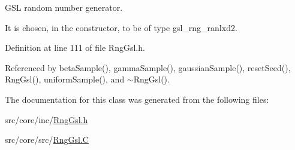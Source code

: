 G\-S\-L random number generator. 

It is chosen, in the constructor, to be of type gsl\-\_\-rng\-\_\-ranlxd2. 

Definition at line 111 of file Rng\-Gsl.\-h.



Referenced by beta\-Sample(), gamma\-Sample(), gaussian\-Sample(), reset\-Seed(), Rng\-Gsl(), uniform\-Sample(), and $\sim$\-Rng\-Gsl().



The documentation for this class was generated from the following files\-:\begin{DoxyCompactItemize}
\item 
src/core/inc/\hyperlink{_rng_gsl_8h}{Rng\-Gsl.\-h}\item 
src/core/src/\hyperlink{_rng_gsl_8_c}{Rng\-Gsl.\-C}\end{DoxyCompactItemize}
